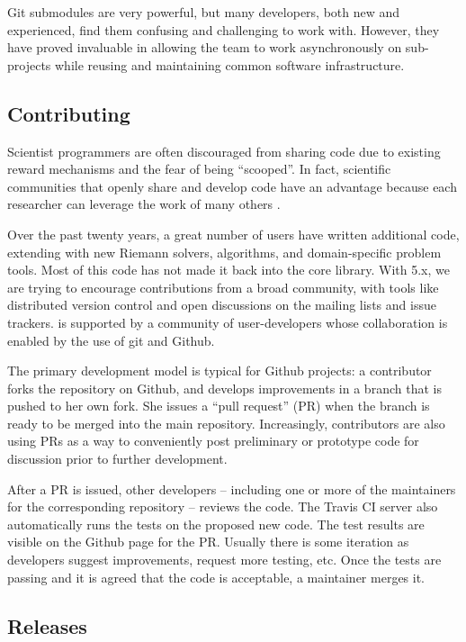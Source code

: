 Git submodules are very powerful, but many developers, both new and
experienced, find them confusing and challenging to work with.
However, they have proved invaluable in allowing the \clawpack team to
work asynchronously on sub-projects while reusing and maintaining
common software infrastructure.

\subsection{Contributing}


Scientist programmers are often discouraged from sharing code
due to existing reward mechanisms and the fear of being ``scooped''.
In fact, scientific communities that openly share and develop code
have an advantage because each researcher can leverage the work of
many others \cite{Turk:2013hd}.

Over the past twenty years, a great number of users have written
additional code, extending \clawpack with new Riemann solvers,
algorithms, and domain-specific problem tools.  Most of this code
has not made it back into the core library.  With \clawpack 5.x,
we are trying to encourage contributions from a broad community, with
tools like distributed version control and open discussions on 
the mailing lists and issue trackers.
\clawpack is supported by a community of user-developers whose
collaboration is enabled by the use of git and Github.



The primary development model
is typical for Github projects: a contributor forks the repository on Github,
and develops improvements in a branch that is pushed to her own fork.
She issues a ``pull request'' (PR) when the branch is ready to be merged
into the main repository.  Increasingly, contributors are also using
PRs as a way to conveniently post preliminary or prototype code for
discussion prior to further development.

After a PR is issued, other developers -- including one or more of the
maintainers for the corresponding repository -- reviews the code.  The Travis
CI server also automatically runs the tests on the proposed new code.  The test
results are visible on the Github page for the PR.  Usually there is some
iteration as developers suggest improvements, request more testing, etc.
Once the tests are passing and it is agreed that the code is acceptable, a
maintainer merges it.

\subsection{Releases}

